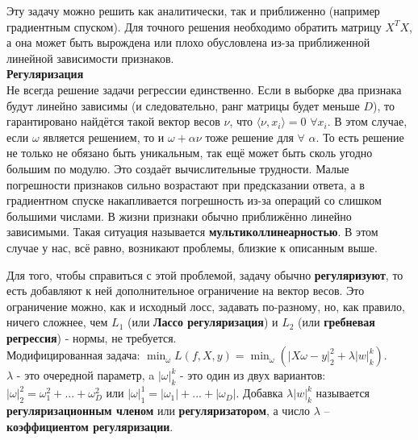 Эту задачу можно решить как аналитически, так и приближенно (например градиентным спуском).
Для точного решения необходимо обратить матрицу $X^TX$, а она может быть вырождена или плохо обусловлена из-за приближенной линейной зависимости признаков. \\
\textbf{Регуляризация} \\
Не всегда решение задачи регрессии единственно. Если в выборке два признака будут линейно зависимы (и следовательно, ранг матрицы будет меньше $D$), то гарантировано найдётся такой вектор весов $\nu$, что $\langle\nu,x_i\rangle=0  
 $ $\forall x_i$. В этом случае, если $\omega$ является решением, то и $\omega+\alpha\nu$ тоже решение для $\forall$ $\alpha$. То есть решение не только не обязано быть уникальным, так ещё может быть сколь угодно большим по модулю. Это создаёт вычислительные трудности. Малые погрешности признаков сильно возрастают при предсказании ответа, а в градиентном спуске накапливается погрешность из-за операций со слишком большими числами. В жизни признаки обычно приближённо линейно зависимыми. Такая ситуация называется \textbf{мультиколлинеарностью}. В этом случае у нас, всё равно, возникают проблемы, близкие к описанным выше. 
\par Для того, чтобы справиться с этой проблемой, задачу обычно \textbf{регуляризуют}, то есть добавляют к ней дополнительное ограничение на вектор весов. Это ограничение можно, как и исходный лосс, задавать по-разному, но, как правило, ничего сложнее, чем $L_1$ (или \textbf{Лассо регуляризация}) и $L_2$ (или \textbf{гребневая регрессия}) - нормы, не требуется. \\
Модифицированная задача: $\min_{\omega}L(f, X, y) = \min_{\omega}(|X\omega-y|_2^2+\lambda|w|_k^k)$. \\
$\lambda$ - это очередной параметр, a $|\omega|_k^k$ - это один из двух вариантов:
$|\omega|_2^2=\omega_1^2+...+\omega_D^2$ или $ |\omega|_1^1=|\omega_1|+...+|\omega_D|$.
Добавка $\lambda|w|_k^k$ называется \textbf{регуляризационным членом} или \textbf{регуляризатором}, а число $\lambda$ – \textbf{коэффициентом регуляризации}.

